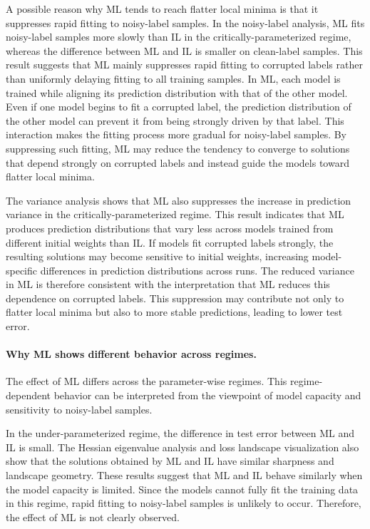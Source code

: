 \documentclass[dvipdfmx]{nolta}
\begin{document}
A possible reason why ML tends to reach flatter local minima is that it suppresses rapid fitting to noisy-label samples. In the noisy-label analysis, ML fits noisy-label samples more slowly than IL in the critically-parameterized regime, whereas the difference between ML and IL is smaller on clean-label samples. This result suggests that ML mainly suppresses rapid fitting to corrupted labels rather than uniformly delaying fitting to all training samples. In ML, each model is trained while aligning its prediction distribution with that of the other model. Even if one model begins to fit a corrupted label, the prediction distribution of the other model can prevent it from being strongly driven by that label. This interaction makes the fitting process more gradual for noisy-label samples. By suppressing such fitting, ML may reduce the tendency to converge to solutions that depend strongly on corrupted labels and instead guide the models toward flatter local minima.

The variance analysis shows that ML also suppresses the increase in prediction variance in the critically-parameterized regime. This result indicates that ML produces prediction distributions that vary less across models trained from different initial weights than IL. If models fit corrupted labels strongly, the resulting solutions may become sensitive to initial weights, increasing model-specific differences in prediction distributions across runs. The reduced variance in ML is therefore consistent with the interpretation that ML reduces this dependence on corrupted labels. This suppression may contribute not only to flatter local minima but also to more stable predictions, leading to lower test error.

\paragraph{Why ML shows different behavior across regimes.}

The effect of ML differs across the parameter-wise regimes. This regime-dependent behavior can be interpreted from the viewpoint of model capacity and sensitivity to noisy-label samples.

In the under-parameterized regime, the difference in test error between ML and IL is small. The Hessian eigenvalue analysis and loss landscape visualization also show that the solutions obtained by ML and IL have similar sharpness and landscape geometry. These results suggest that ML and IL behave similarly when the model capacity is limited. Since the models cannot fully fit the training data in this regime, rapid fitting to noisy-label samples is unlikely to occur. Therefore, the effect of ML is not clearly observed.
\end{document}
